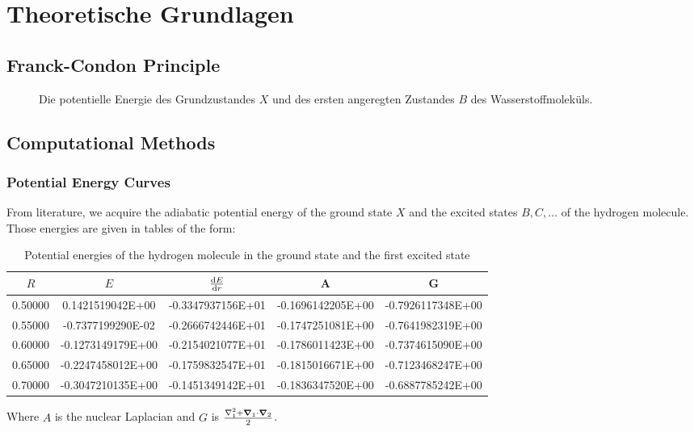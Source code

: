 \chapter{Theoretische Grundlagen} \label{sec:theorie}

\section{Franck-Condon Principle}

\begin{figure}[tbhp]
    \centering
    
    \caption{Die potentielle Energie des Grundzustandes $X$ und des ersten angeregten Zustandes $B$ des Wasserstoffmoleküls.}
    \label{fig:potentielle_Energie_X_und_B}
\end{figure}

\section{Computational Methods}

\subsection{Potential Energy Curves}

From literature, we acquire the adiabatic potential energy of the ground state $X$ and the excited states  $B, C, \ldots$ of the hydrogen molecule.
Those energies are given in tables of the form:
\begin{table}[H]
    \centering
    \begin{tabular}{c|c|c|c|c}
        $R$  & $E$  & $\dv{E}{r}$ & A & G  \\
        \hline
       0.50000& 0.1421519042E+00&-0.3347937156E+01&-0.1696142205E+00&-0.7926117348E+00\\
       0.55000&-0.7377199290E-02&-0.2666742446E+01&-0.1747251081E+00&-0.7641982319E+00\\
       0.60000&-0.1273149179E+00&-0.2154021077E+01&-0.1786011423E+00&-0.7374615090E+00\\
       0.65000&-0.2247458012E+00&-0.1759832547E+01&-0.1815016671E+00&-0.7123468247E+00\\
       0.70000&-0.3047210135E+00&-0.1451349142E+01&-0.1836347520E+00&-0.6887785242E+00\\
    \end{tabular}
    \caption{Potential energies of the hydrogen molecule in the ground state and the first excited state}
    \label{tab:potential_energies}
\end{table}
Where $A$ is the nuclear Laplacian %
and  $G$ is  $\frac{\laplacian_1 + \grad_1 \cdot \grad_2}{2}$.

